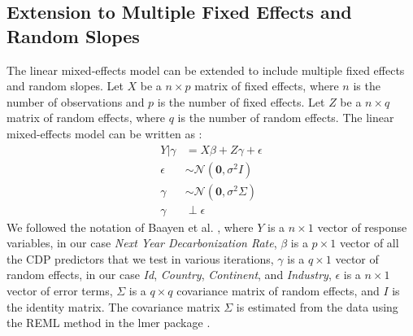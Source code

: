 \subsection{Extension to Multiple Fixed Effects and Random Slopes}
The linear mixed-effects model can be extended to include multiple fixed effects and random slopes. Let $X$ be a $n \times p$ matrix of fixed effects, where $n$ is the number of observations and $p$ is the number of fixed effects. Let $Z$ be a $n \times q$ matrix of random effects, where $q$ is the number of random effects. The linear mixed-effects model can be written as \cite{duke_sta216_lecture}:
\begin{align}
    Y|\gamma &= X\beta + Z\gamma + \epsilon \\
    \epsilon &\sim \mathcal{N}(\mathbf{0}, \sigma^2I) \\
    \gamma &\sim \mathcal{N}(\mathbf{0}, \sigma^2\Sigma) \\
    \gamma &\perp \epsilon
\end{align}
We followed the notation of Baayen et al. \cite{BAAYEN2008390}, where $Y$ is a $n \times 1$ vector of response variables, in our case \textit{Next Year Decarbonization Rate}, $\beta$ is a $p \times 1$ vector of all the CDP predictors that we test in various iterations, $\gamma$ is a $q \times 1$ vector of random effects, in our case \textit{Id}, \textit{Country}, \textit{Continent}, and \textit{Industry}, $\epsilon$ is a $n \times 1$ vector of error terms, $\Sigma$ is a $q \times q$ covariance matrix of random effects, and $I$ is the identity matrix. The covariance matrix $\Sigma$ is estimated from the data using the REML method in the lmer package \cite{bates}.




